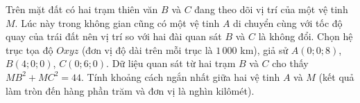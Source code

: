\begin{bt}%

	Trên mặt đất có hai trạm thiên văn $B$ và $C$ đang theo dõi vị trí của một vệ tinh $M$. Lúc này trong không gian cũng có một vệ tinh $A$ di chuyển cùng với tốc độ quay của trái đất nên vị trí so với hai đài quan sát $B$ và $C$ là không đổi. Chọn hệ trục tọa độ $Oxyz$ (đơn vị độ dài trên mỗi trục là $1\,000$ km), giả sử $A(0; 0; 8)$, $B(4; 0; 0)$, $C(0; 6; 0)$. Dữ liệu quan sát từ hai trạm $B$ và $C$ cho thấy $MB^2+MC^2=44$. Tính khoảng cách ngắn nhất giữa hai vệ tinh $A$ và $M$ (kết quả làm tròn đến hàng phần trăm và đơn vị là nghìn kilômét).
\end{bt}

